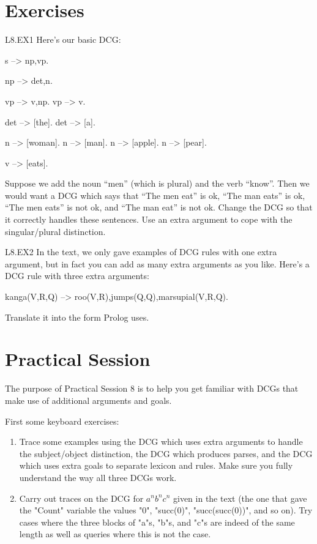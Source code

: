\section{Exercises}\label{SEC.L8.EXERCISES}

\begin{LPNexercise}{L8.EX1} Here's our basic DCG:
\begin{LPNcodedisplay}
s --> np,vp.

np --> det,n.

vp --> v,np.
vp --> v.

det --> [the].
det --> [a].

n --> [woman].
n --> [man].
n --> [apple].
n --> [pear].

v --> [eats].
\end{LPNcodedisplay}


Suppose we add the noun ``men'' (which is plural) and the verb
``know''.  Then we would want a DCG which says that ``The men eat''
is ok, ``The man eats'' is ok, ``The men eats'' is not ok, and
``The man eat'' is not ok. Change the DCG so that it correctly
handles these sentences. Use an extra argument to cope with the
singular/plural distinction.
\end{LPNexercise}



\begin{LPNexercise}{L8.EX2}
In the text, we only gave examples of DCG rules
with one extra argument, but in fact you can add as many extra
arguments as you like. Here's a DCG rule
with three extra arguments:
\begin{LPNcodedisplay}
kanga(V,R,Q) --> roo(V,R),jumps(Q,Q),{marsupial(V,R,Q)}.
\end{LPNcodedisplay}
Translate it into the form Prolog uses.
\end{LPNexercise}

\section{Practical Session}\label{SEC.L8.PRAXIS}



The purpose of Practical Session 8 is to help you get familiar with
DCGs that make use of additional arguments and goals.

First some keyboard exercises:
\begin{enumerate}
\item{}Trace some examples using the DCG which uses extra arguments to
handle the subject/object distinction, the DCG which produces parses, and
the DCG which uses extra goals to separate lexicon and rules. Make sure
you fully understand the way all three DCGs work.

\item{}Carry out traces on the DCG for $a^nb^nc^n$ given in the text
(the one that gave the "Count" variable the values "0", "succ(0)",
"succ(succ(0))", and so on). Try cases where the three blocks of "a"s,
"b"s, and "c"s are indeed of the same length as well as queries where
this is not the case.
\end{enumerate}


